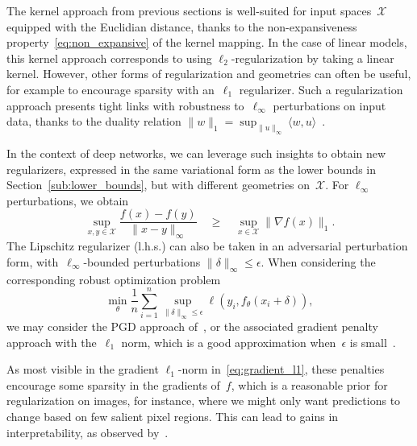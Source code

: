 

The kernel approach from previous sections is well-suited for input spaces~$\mathcal X$ equipped with the Euclidian
distance, thanks to the non-expansiveness property~\eqref{eq:non_expansive} of the kernel mapping.
In the case of linear models, this kernel approach corresponds to using $\ell_2$-regularization by taking a linear kernel.
However, other forms of regularization and geometries can often be useful,
for example to encourage sparsity with an~$\ell_1$ regularizer.
Such a regularization approach presents tight links with robustness to~$\ell_\infty$ perturbations on input data,
thanks to the duality relation $\|w\|_1 = \sup_{\|u\|_\infty} \langle w, u \rangle$~\citep[see][]{xu2009robust}.

In the context of deep networks, we can leverage such insights to obtain new regularizers,
expressed in the same variational form as the lower bounds in Section~\ref{sub:lower_bounds},
but with different geometries on~$\mathcal X$. For $\ell_\infty$ perturbations, we obtain
\begin{equation}
\label{eq:gradient_l1}
\sup_{x, y\in \mathcal X} \frac{f(x) - f(y)}{\|x - y\|_\infty} \quad \geq \quad \sup_{x \in \mathcal X} \|\nabla f(x) \|_1.
\end{equation}
The Lipschitz regularizer (l.h.s.) can also be taken in an adversarial perturbation form, with~$\ell_\infty$-bounded perturbations $\|\delta\|_\infty \leq \epsilon$.
When considering the corresponding robust optimization problem
\begin{equation}
\label{eq:robust_linf}
\min_\theta \frac{1}{n} \sum_{i=1}^n \sup_{\|\delta\|_\infty \leq \epsilon} \ell(y_i, f_\theta(x_i + \delta)),
\end{equation}
we may consider the PGD approach of~\citet{madry2018towards}, or the associated gradient penalty
approach with the~$\ell_1$ norm, which is a good approximation when~$\epsilon$ is small~\citep{lyu2015unified,simon2018adversarial}.

As most visible in the gradient $\ell_1$-norm in~\eqref{eq:gradient_l1}, these penalties encourage some sparsity
in the gradients of~$f$, which is a reasonable prior for regularization on images, for instance, where we might only
want predictions to change based on few salient pixel regions. This can lead to gains in interpretability, as observed by~\citet{tsipras2018there}.

